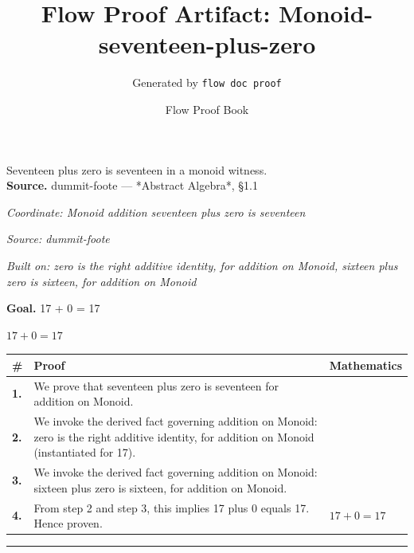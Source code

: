 \documentclass[11pt]{article}
\title{Flow Proof Artifact: Monoid-seventeen-plus-zero}
\author{Generated by \texttt{flow doc proof}}
\date{Flow Proof Book}
\theoremstyle{definition}
\begin{document}
\maketitle
Seventeen plus zero is seventeen in a monoid witness.\\[0.5em]
\textbf{Source.} dummit-foote — *Abstract Algebra*, §1.1\\[0.5em]
\bigskip
{}\par
\smallskip\noindent\textit{Coordinate: Monoid \cdot addition \cdot seventeen plus zero is seventeen}\par
\smallskip\noindent\textit{Source: dummit-foote}\par
\smallskip\noindent\textit{Built on: zero is the right additive identity, for addition on Monoid, sixteen plus zero is sixteen, for addition on Monoid}\par
\medskip
\noindent\textbf{Goal.} 17 + 0 = 17\par
\noindent$\displaystyle 17 + 0 = 17$\par
\medskip
\noindent
\begin{tabular}{@{} >{\raggedright\arraybackslash}p{} >{\raggedright\arraybackslash}p{} >{\raggedleft\arraybackslash}p{} @{}}
\textbf{\#} & \textbf{Proof} & \textbf{Mathematics} \\
\midrule
\textbf{1.} & We prove that seventeen plus zero is seventeen for addition on Monoid. & \\[0.45em]
\textbf{2.} & We invoke the derived fact governing addition on Monoid: zero is the right additive identity, for addition on Monoid (instantiated for 17). & \\[0.45em]
\textbf{3.} & We invoke the derived fact governing addition on Monoid: sixteen plus zero is sixteen, for addition on Monoid. & \\[0.45em]
\textbf{4.} & From step 2 and step 3, this implies 17 plus 0 equals 17. Hence proven. & $\displaystyle 17 + 0 = 17$ \\[0.45em]
\bottomrule
\end{tabular}
\label{thm:Monoid-addition-seventeen_plus_zero_is_seventeen}
\par\medskip\hrule
\end{document}
